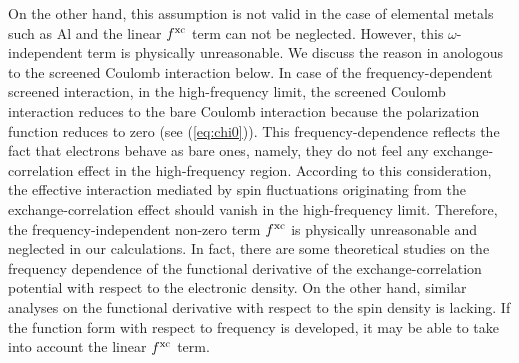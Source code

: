 On the other hand, this assumption is not valid in the case of elemental metals such as Al and the 
linear $f^{\rm xc}$ term can not be neglected.
However, this $\omega$-independent term is physically unreasonable. 
We discuss the reason in anologous to the screened Coulomb interaction below.
In case of the frequency-dependent screened interaction, in the high-frequency limit, 
the screened Coulomb interaction reduces to the bare Coulomb interaction because
the polarization function reduces to zero (see (\ref{eq:chi0})).
This frequency-dependence reflects the fact that electrons behave as bare ones, namely, 
they do not feel any exchange-correlation effect in the high-frequency region.
According to this consideration, the effective interaction mediated by spin fluctuations originating
from the exchange-correlation effect should vanish in the high-frequency limit.
Therefore, the frequency-independent non-zero term $f^{\rm xc}$ is physically unreasonable and 
neglected in our calculations.
In fact, there are some theoretical studies on the frequency dependence of the functional derivative
of the exchange-correlation potential with respect to the electronic density\cite{Qian2002}.
On the other hand, similar analyses on the functional derivative with respect to the spin density is lacking.
If the function form with respect to frequency is developed, it may be able to take into account the 
linear $f^{\rm xc}$ term.
%
%
%
%
%


